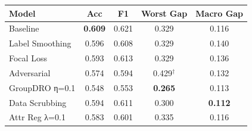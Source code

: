 \begin{tabular}{lcccc}
\toprule
\textbf{Model} & \textbf{Acc} & \textbf{F1} & \textbf{Worst Gap} & \textbf{Macro Gap} \\
\midrule
Baseline & \textbf{0.609} & 0.621 & 0.329 & 0.116 \\
\midrule
Label Smoothing & 0.596 & 0.608 & 0.329 & 0.140 \\
Focal Loss & 0.593 & 0.613 & 0.329 & 0.136 \\
Adversarial & 0.574 & 0.594 & 0.429$^\dagger$ & 0.132 \\
GroupDRO η=0.1 & 0.548 & 0.553 & \textbf{0.265} & 0.113 \\
\midrule
Data Scrubbing & 0.594 & 0.611 & 0.300 & \textbf{0.112} \\
Attr Reg λ=0.1 & 0.583 & 0.601 & 0.335 & 0.116 \\
\bottomrule
\end{tabular}
